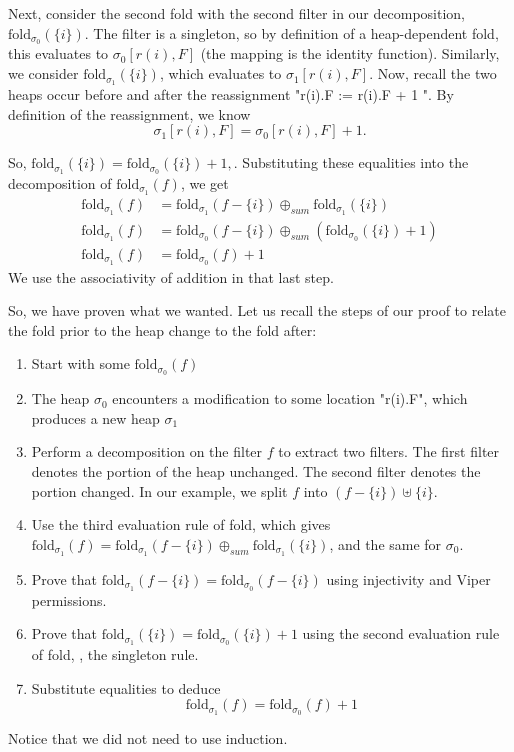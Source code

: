 \documentclass[msc,oneside]{ubcthesis}
\theoremstyle{definition}
\begin{document}
Next, consider the second fold with the second filter in our decomposition, $\textrm{fold}_{\sigma_0}(\{i\})$. The filter is a singleton, so by definition of a heap-dependent fold, this evaluates to $\sigma_0[r(i),F]$ (the mapping is the identity function). Similarly, we consider $\textrm{fold}_{\sigma_1}(\{i\})$, which evaluates to $\sigma_1[r(i),F]$. Now, recall the two heaps occur before and after the reassignment "r(i).F := r(i).F + 1 ". By definition of the reassignment, we know 
$$\sigma_1[r(i),F] = \sigma_0[r(i),F] + 1.$$

So, $\textrm{fold}_{\sigma_1}(\{i\}) = \textrm{fold}_{\sigma_0}(\{i\}) + 1,$. Substituting these equalities into the decomposition of $\textrm{fold}_{\sigma_1}(f)$, we get
\begin{align*} 
\textrm{fold}_{\sigma_1}(f) &= \textrm{fold}_{\sigma_1}(f - \{i\}) \oplus_{sum} \textrm{fold}_{\sigma_1}(\{i\}) \\
\textrm{fold}_{\sigma_1}(f) &= \textrm{fold}_{\sigma_0}(f - \{i\}) \oplus_{sum} (\textrm{fold}_{\sigma_0}(\{i\}) + 1) \\
\textrm{fold}_{\sigma_1}(f) &= \textrm{fold}_{\sigma_0}(f) + 1 
\end{align*}
We use the associativity of addition in that last step. 

So, we have proven what we wanted.
Let us recall the steps of our proof to relate the fold prior to the heap change to the fold after:
\begin{enumerate}
    \item Start with some $\textrm{fold}_{\sigma_0}(f)$
    \item The heap $\sigma_0$ encounters a modification to some location "r(i).F", which produces a new heap $\sigma_1$
    \item Perform a decomposition on the filter $f$ to extract two filters. The first filter denotes the portion of the heap unchanged. The second filter denotes the portion changed. In our example, we split $f$ into $\left( f - \{i\}\right) \uplus \{i\} $.
    \item Use the third evaluation rule of fold, which gives $\textrm{fold}_{\sigma_1}(f) = \textrm{fold}_{\sigma_1}(f - \{i\}) \oplus_{sum} \textrm{fold}_{\sigma_1}(\{i\}) $, and the same for $\sigma_0$.
    \item Prove that $\textrm{fold}_{\sigma_1}(f - \{i\}) = \textrm{fold}_{\sigma_0}(f - \{i\})$ using injectivity and Viper permissions.
    \item Prove that $\textrm{fold}_{\sigma_1}(\{i\}) = \textrm{fold}_{\sigma_0}(\{i\}) + 1$ using the second evaluation rule of fold, \ie, the singleton rule.
    \item Substitute equalities to deduce $$\textrm{fold}_{\sigma_1}(f) = \textrm{fold}_{\sigma_0}(f) + 1$$
\end{enumerate}
Notice that we did not need to use induction. 
\end{document}

